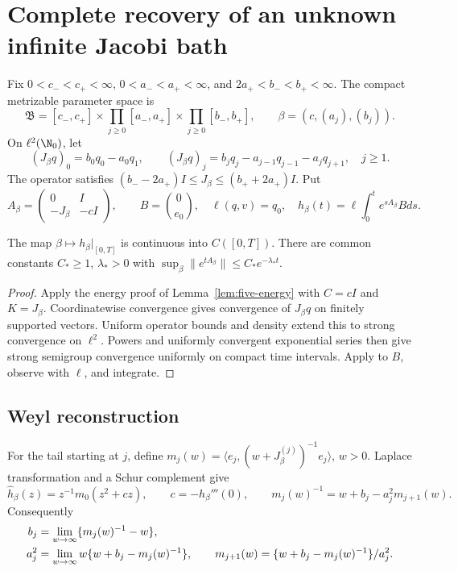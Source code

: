 \section{Complete recovery of an unknown infinite Jacobi bath}
\label{sec:infinite-jacobi}
Fix \(0<c_-<c_+<\infty\), \(0<a_-<a_+<\infty\), and
\(2a_+<b_-<b_+<\infty\). The compact metrizable parameter space is
\begin{equation}
 \mathfrak B=[c_-,c_+]\times\prod_{j\ge0}[a_-,a_+]
 \times\prod_{j\ge0}[b_-,b_+],\qquad \beta=(c,(a_j),(b_j)).
 \label{eq:jacobi-parameter}
\end{equation}
On \(\ell^2(\N_0)\), let
\[
 (J_\beta q)_0=b_0q_0-a_0q_1,\qquad
 (J_\beta q)_j=b_jq_j-a_{j-1}q_{j-1}-a_jq_{j+1},\quad j\ge1.
\]
The operator satisfies \((b_--2a_+)I\le J_\beta\le(b_++2a_+)I\).
Put
\[
 A_\beta=\begin{pmatrix}0&I\\-J_\beta&-cI\end{pmatrix},\qquad
 B=\binom0{e_0},\quad\ell(q,v)=q_0,\quad
 h_\beta(t)=\ell\int_0^te^{sA_\beta}Bds.
\]

\begin{lemma}
\label{lem:product-continuity}
The map \(\beta\mapsto h_\beta|_{[0,T]}\) is continuous into
\(C([0,T])\). There are common constants \(C_*\ge1\), \(\lambda_*>0\)
with \(\sup_\beta\|e^{tA_\beta}\|\le C_*e^{-\lambda_*t}\).
\end{lemma}
\begin{proof}
Apply the energy proof of Lemma~\ref{lem:five-energy} with \(C=cI\)
and \(K=J_\beta\). Coordinatewise convergence gives convergence of
\(J_\beta q\) on finitely supported vectors. Uniform operator bounds and
density extend this to strong convergence on \(\ell^2\). Powers and
uniformly convergent exponential series then give strong semigroup
convergence uniformly on compact time intervals. Apply to \(B\), observe
with \(\ell\), and integrate.
\end{proof}

\subsection{Weyl reconstruction}
For the tail starting at \(j\), define
\(m_j(w)=\langle e_j,(w+J_\beta^{(j)})^{-1}e_j\rangle\), \(w>0\).
Laplace transformation and a Schur complement give
\begin{equation}
 \widehat h_\beta(z)=z^{-1}m_0(z^2+cz),\qquad
 c=-h_\beta'''(0),\qquad
 m_j(w)^{-1}=w+b_j-a_j^2m_{j+1}(w).
 \label{eq:jacobi-transfer}
\end{equation}
Consequently
\begin{align}
 b_j&=\lim_{w\to\infty}\{m_j(w)^{-1}-w\},\notag\\
 a_j^2&=\lim_{w\to\infty}w\{w+b_j-m_j(w)^{-1}\},\qquad
 m_{j+1}(w)=\{w+b_j-m_j(w)^{-1}\}/a_j^2.
 \label{eq:recover-tail}
\end{align}

